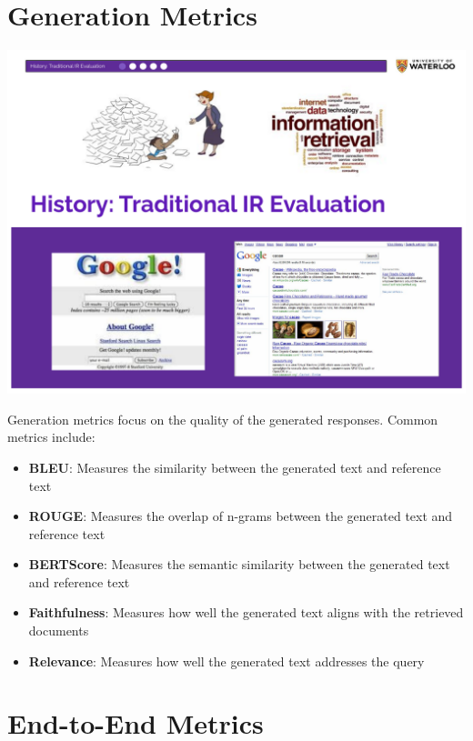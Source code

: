 \documentclass[
  letterpaper,
  oneside]{scrbook}
\providecommand{\tightlist}{%
  \setlength{\itemsep}{0pt}\setlength{\parskip}{0pt}}\usepackage{longtable,booktabs,array}
\begin{document}
\section{Generation Metrics}\label{generation-metrics}

\includegraphics{chapters/../p2-images/slide_4.png}

Generation metrics focus on the quality of the generated responses.
Common metrics include:

\begin{itemize}
\tightlist
\item
  \textbf{BLEU}: Measures the similarity between the generated text and
  reference text
\item
  \textbf{ROUGE}: Measures the overlap of n-grams between the generated
  text and reference text
\item
  \textbf{BERTScore}: Measures the semantic similarity between the
  generated text and reference text
\item
  \textbf{Faithfulness}: Measures how well the generated text aligns
  with the retrieved documents
\item
  \textbf{Relevance}: Measures how well the generated text addresses the
  query
\end{itemize}

\section{End-to-End Metrics}\label{end-to-end-metrics}
\end{document}
